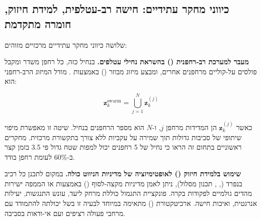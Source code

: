 \begin{table}[htbp]
\centering
\caption{סיכום מגבלות המערכת הנוכחית ופתרונות עתידיים מוצעים לכל תת-מערכת. (Summary of current system limitations and proposed future solutions for each subsystem.)}
\label{tab:ch09_limitations}
\end{table}

\subsection{כיווני מחקר עתידיים: חישה רב-עטלפית, למידת חיזוק, חומרה מתקדמת}
\label{sec:ch09_future_work}

שלושה כיווני מחקר עתידיים מרכזיים מזוהים:

\textbf{מעבר למערכת רב-רחפנית () בהשראת נחילי עטלפים.} בנחיל כזה, כל רחפן משדר ומקבל פולסים על-קוליים מרחפנים אחרים, ומבצע מיזוג מבוזר () באמצעות . מודל המיזוג הרב-רחפני הוא:

\begin{equation}
\mathbf{z}_{k}^{\text{swarm}} = \bigcup_{j=1}^{N} \mathbf{z}_{k}^{(j)}
\label{eq:ch09_swarm_fusion}
\end{equation}

כאשר $\mathbf{z}_{k}^{(j)}$ הן המדידות מרחפן $j$, ו-$N$ הוא מספר הרחפנים בנחיל. שיטה זו מאפשרת מיפוי שיתופי של סביבות גדולות תוך שמירה על עקביות ללא צורך בתקשורת מרכזית. מחקרים ראשוניים בתחום זה הראו כי נחיל של 5 רחפנים יכול למפות שטח גדול פי 3.5 בזמן קצר ב-60\% לעומת רחפן בודד. \cite{Julier1997CovarianceIntersection} \cite{Thrun2005ProbRobotics}

\textbf{שימוש בלמידת חיזוק () לאופטימיזציה של מדיניות הניווט כולה.} במקום לתכנן כל רכיב בנפרד (, , תכנון מסלול), ניתן לאמן מדיניות מקצה-לסוף () באמצעות  או  הממפה ישירות מהדים גולמיים לפקודות בקרה. פונקציית התגמול כוללת מרחק ליעד, עונש התנגשות, יעילות אנרגטית, ואיכות חישה. ארכיטקטורת  () מתאימה במיוחד לבעיה זו בשל יכולתה להתמודד עם מרחבי פעולה רציפים ועם אי-ודאות בסביבה. \cite{AnthropicClaude}

